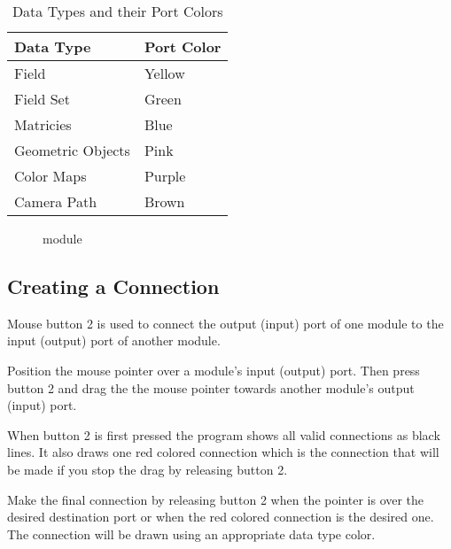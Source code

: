 \begin{table}[htbp]
  \begin{center}
    \begin{tabular}{|l|l|}
      \hline
      \textbf{Data Type} & \textbf{Port Color} \\
      \hline
      Field & Yellow \\
      Field Set & Green \\
      Matricies & Blue \\
      Geometric Objects & Pink \\
      Color Maps & Purple \\
      Camera Path & Brown \\
      \hline
    \end{tabular}
    \caption{Data Types and their Port Colors}
    \label{tab:portcolors}
  \end{center}
\end{table}


\begin{figure}[htb]
  \begin{makeimage}
  \end{makeimage}
  \caption{\label{fig:module} \sr{} module}
\end{figure}


\subsection{Creating a Connection}
\label{sec:connectmods}

Mouse button 2 is used to connect the output (input) port of one module to the
input (output) port of another module.  


Position the mouse pointer over a module's input (output) port.  Then press
button 2 and drag the the mouse pointer towards another module's output (input)
port.   

When button 2 is first pressed the program shows all valid connections as
black lines.  It also draws one red colored connection which is the
connection that will be made if you stop the drag by releasing 
button 2.

Make the final connection by releasing button 2 when the pointer is over
the desired destination port or when the red colored connection is the
desired one.  The connection will be drawn using an appropriate data type
color.

